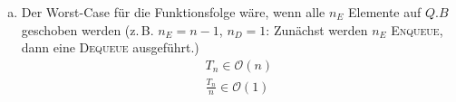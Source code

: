 \documentclass[a4paper]{scrartcl}
\begin{document}
\begin{enumerate}[(a)]
    \item
        Der Worst-Case für die Funktionsfolge wäre, wenn alle $n_E$ Elemente
        auf $Q.B$ geschoben werden (z.\,B. $n_E = n-1$, $n_D = 1$: Zunächst
        werden $n_E$ \textsc{Enqueue}, dann eine \textsc{Dequeue} ausgeführt.)
        \begin{align*}
            T_n \in \mathcal{O}(n) \\
            \frac{T_n}{n} \in \mathcal{O}(1)
        \end{align*}
        
        

\end{enumerate}
\end{document}

